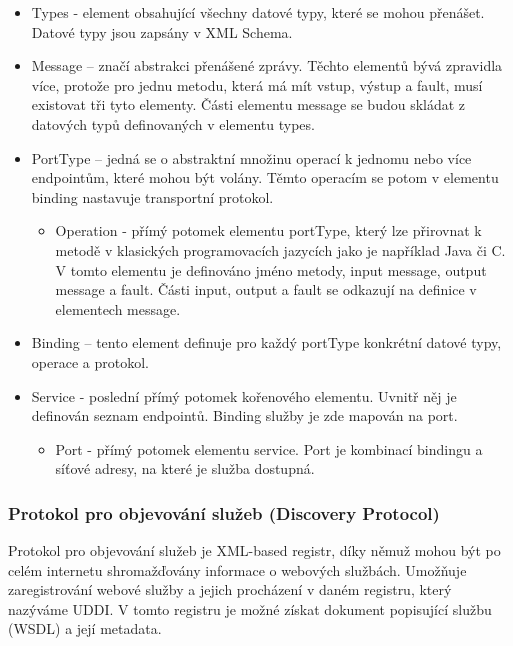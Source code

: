 \documentclass[11pt,twoside,a4paper]{book}
\begin{document}
\begin{itemize}
  \item Types - element obsahující všechny datové typy, které se mohou přenášet. Datové
typy jsou zapsány v XML Schema.

  \item Message – značí abstrakci přenášené zprávy. Těchto elementů bývá zpravidla více,
protože pro jednu metodu, která má mít vstup, výstup a fault, musí existovat tři tyto
elementy. Části elementu message se budou skládat z datových typů definovaných v
 elementu types. 

  \item PortType – jedná se o abstraktní množinu operací k jednomu nebo více endpointům,
které mohou být volány. Těmto operacím se potom v elementu binding nastavuje
transportní protokol.

  \begin{itemize}
    \item Operation - přímý potomek elementu portType, který lze přirovnat k metodě v
klasických programovacích jazycích jako je například Java či C. V tomto
elementu je definováno jméno metody, input message, output message a fault.
Části input, output a fault se odkazují na definice v elementech message.

  \end{itemize}
  \item Binding – tento element definuje pro každý portType konkrétní datové typy, operace
a protokol.

  \item Service - poslední přímý potomek kořenového elementu. Uvnitř něj je definován
seznam endpointů. Binding služby je zde mapován na port.

  \begin{itemize}
    \item Port - přímý potomek elementu service. Port je kombinací bindingu a síťové
adresy, na které je služba dostupná.

  \end{itemize}
\end{itemize}

\subsubsection{Protokol pro objevování služeb (Discovery Protocol)}
Protokol pro objevování služeb je XML-based registr, díky němuž mohou být po celém
internetu shromažďovány informace o webových službách. Umožňuje zaregistrování webové
služby a jejich procházení v daném registru, který nazýváme UDDI. V tomto registru je
možné získat dokument popisující službu (WSDL) a její metadata.
\end{document}
